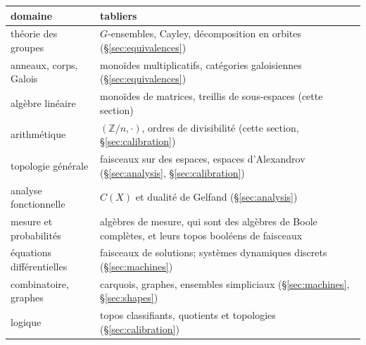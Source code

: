 \begin{center}\small
\begin{tabularx}{\linewidth}{>{\raggedright\arraybackslash}p{3.6cm}>{\raggedright\arraybackslash}X}
\toprule
domaine & tabliers\\
\midrule
théorie des groupes & $G$-ensembles, Cayley, décomposition en orbites (\S\ref{sec:equivalences})\\
anneaux, corps, Galois & monoïdes multiplicatifs, catégories galoisiennes (\S\ref{sec:equivalences})\\
algèbre linéaire & monoïdes de matrices, treillis de sous-espaces (cette section)\\
arithmétique & $(\mathbb Z/n,\cdot)$, ordres de divisibilité (cette section, \S\ref{sec:calibration})\\
topologie générale & faisceaux sur des espaces, espaces d'Alexandrov (\S\ref{sec:analysis}, \S\ref{sec:calibration})\\
analyse fonctionnelle & $C(X)$ et dualité de Gelfand (\S\ref{sec:analysis})\\
mesure et probabilités & algèbres de mesure, qui sont des algèbres de Boole complètes, et leurs topos booléens de faisceaux\\
équations différentielles & faisceaux de solutions; systèmes dynamiques discrets (\S\ref{sec:machines})\\
combinatoire, graphes & carquois, graphes, ensembles simpliciaux (\S\ref{sec:machines}, \S\ref{sec:shapes})\\
logique & topos classifiants, quotients et topologies (\S\ref{sec:calibration})\\
\bottomrule
\end{tabularx}
\end{center}
